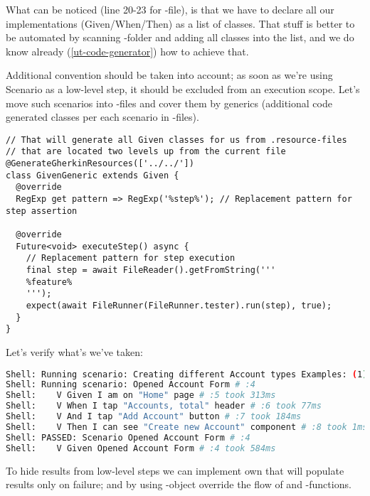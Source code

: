 What can be noticed (line 20-23 for -file), is that we have to declare all our 
implementations (Given/When/Then) as a list of classes. That stuff is better to be automated by scanning 
-folder and adding all classes into the list, and we do know already (\ref{ut-code-generator}) how to 
achieve that.

Additional convention should be taken into account; as soon as we're using Scenario as a low-level step, it should be
excluded from an execution scope. Let's move such scenarios into -files and cover them by generics 
(additional code generated classes per each scenario in -files).

\begin{lstlisting}
// That will generate all Given classes for us from .resource-files
// that are located two levels up from the current file
@GenerateGherkinResources(['../../'])
class GivenGeneric extends Given {
  @override
  RegExp get pattern => RegExp('%step%'); // Replacement pattern for step assertion

  @override
  Future<void> executeStep() async {
    // Replacement pattern for step execution
    final step = await FileReader().getFromString('''
    %feature%
    ''');
    expect(await FileRunner(FileRunner.tester).run(step), true);
  }
}
\end{lstlisting}

\noindent Let's verify what's we've taken:

\begin{lstlisting}[language=bash]
Shell: Running scenario: Creating different Account types Examples: (1) # :3
Shell: Running scenario: Opened Account Form # :4
Shell:    V Given I am on "Home" page # :5 took 313ms
Shell:    V When I tap "Accounts, total" header # :6 took 77ms
Shell:    V And I tap "Add Account" button # :7 took 184ms
Shell:    V Then I can see "Create new Account" component # :8 took 1ms
Shell: PASSED: Scenario Opened Account Form # :4
Shell:    V Given Opened Account Form # :4 took 584ms
\end{lstlisting}

\noindent To hide results from low-level steps we can implement own  that will populate results only 
on failure; and by using -object override the flow of  and -functions.

